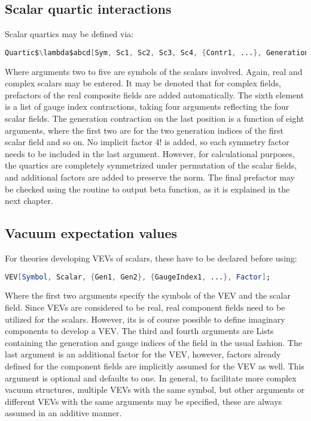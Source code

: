 \documentclass{scrartcl}
\begin{document}
\subsection{Scalar quartic interactions}
Scalar quartics may be defined via:
\begin{lstlisting}[language=mathematica,mathescape,columns=flexible,backgroundcolor=\color{light-gray}]
Quartic$\lambda$abcd[Sym, Sc1, Sc2, Sc3, Sc4, {Contr1, ...}, GenerationContr];
\end{lstlisting}
Where arguments two to five are symbols of the scalars involved. Again, real and complex scalars may be entered. It may be denoted that for complex fields, prefactors of the real composite fields are added automatically. The sixth element is a list of gauge index contractions, taking four arguments reflecting the four scalar fields. The generation contraction on the last position is a function of eight arguments, where the first two are for the two generation indices of the first scalar field and so on. \newline No implicit factor 4! is added, so each symmetry factor needs to be included in the last argument. However, for calculational purposes, the quartics are completely symmetrized under permutation of the scalar fields, and additional factors are added to preserve the norm. The final prefactor may be checked using the routine to output beta function, as it is explained in the next chapter.
\FloatBarrier
\subsection{Vacuum expectation values}
For theories developing VEVs of scalars, these have to be declared before using:
\begin{lstlisting}[language=mathematica,mathescape,columns=flexible,backgroundcolor=\color{light-gray}]
VEV[Symbol, Scalar, {Gen1, Gen2}, {GaugeIndex1, ...}, Factor];
\end{lstlisting}
Where the first two arguments specify the symbols of the VEV and the scalar field. Since VEVs are considered to be real, real component fields need to be utilized for the scalars. However, its is of course possible to define imaginary components to develop a VEV. The third and fourth arguments are Lists containing the generation and gauge indices of the field in the usual fashion. The last argument is an additional factor for the VEV, however, factors already defined for the component fields are implicitly assumed for the VEV as well. This argument is optional and defaults to one. In general, to facilitate more complex vacuum structures, multiple VEVs with the same symbol, but other arguments or different VEVs with the same arguments may be specified, these are always assumed in an additive manner.
\FloatBarrier
\end{document}
